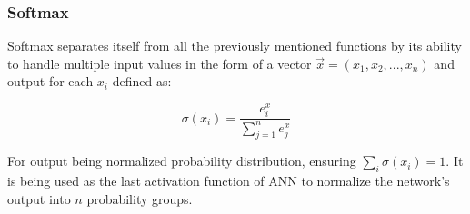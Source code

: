 \subsubsection{Softmax}

Softmax separates itself from all the previously mentioned functions by its ability to handle multiple input values in the form of a vector $\vec{x} = (x_1,x_2,...,x_n)$ and output for each $x_i$ defined as:

\begin{equation}
    {\sigma(x_i) = \frac{e^x_i}{\sum_{j=1}^{n}e^x_j}}
\end{equation}


For output being normalized probability distribution, ensuring $\sum_{i}\sigma(x_i) = 1$.\cite{lipton2015critical} It is being used as the last activation function of ANN to normalize the network's output into $n$ probability groups.
